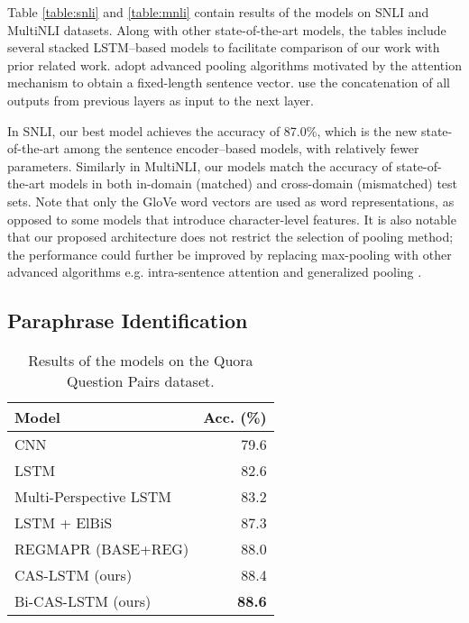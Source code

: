 \documentclass[wcp]{jmlr}
\begin{document}
    Table \ref{table:snli} and \ref{table:mnli} contain results of the models on SNLI and MultiNLI datasets.
    Along with other state-of-the-art models, the tables include several stacked LSTM--based models to facilitate comparison of our work with prior related work.
    \citet{liu2016learning,chen2017gated,chen2018generalized} adopt advanced pooling algorithms motivated by the attention mechanism to obtain a fixed-length sentence vector.
    \citet{nie2017shortcut} use the concatenation of all outputs from previous layers as input to the next layer.
    
    In SNLI, our best model achieves the accuracy of 87.0\%, which is the new state-of-the-art among the sentence encoder--based models, with relatively fewer parameters.
    Similarly in MultiNLI, our models match the accuracy of state-of-the-art models in both in-domain (matched) and cross-domain (mismatched) test sets.
    Note that only the GloVe word vectors are used as word representations, as opposed to some models that introduce character-level features.
    It is also notable that our proposed architecture does not restrict the selection of pooling method; the performance could further be improved by replacing max-pooling with other advanced algorithms e.g. intra-sentence attention \citep{liu2016learning} and generalized pooling \citep{chen2018generalized}.
    
    \subsection{Paraphrase Identification}
    
    \begin{table}[t]
        \centering
        \begin{tabular}{l r}
            \hline
            \bf{Model} & \bf{Acc. (\%)} \\
            \hline
            CNN \citep{wang2017bilateral} & 79.6 \\
            LSTM \citep{wang2017bilateral} & 82.6 \\
            Multi-Perspective LSTM \citep{wang2017bilateral} & 83.2 \\
            LSTM + ElBiS \citep{choi2018elbis} & 87.3 \\
            REGMAPR (BASE+REG) \citep{brahma2018regmapr} & 88.0 \\
            \hline
            CAS-LSTM (ours) &  88.4 \\
            Bi-CAS-LSTM (ours) & \bf{88.6} \\
            \hline 
        \end{tabular}
        \caption{Results of the models on the Quora Question Pairs dataset.}
        \label{table:quora}
    \end{table}
    
\end{document}
